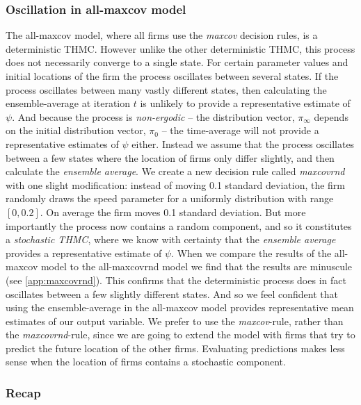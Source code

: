 \documentclass[preprint, 12pt]{elsarticle}
\begin{document}
\subsubsection{Oscillation in all-maxcov model}
\label{sec:oscmaxcov}

The all-maxcov model, where all firms use the \emph{maxcov} decision rules, is a deterministic THMC. However unlike the other deterministic THMC, this process does not necessarily converge to a single state. For certain parameter values and initial locations of the firm the process oscillates between several states. If the process oscillates between many vastly different states, then calculating the ensemble-average at iteration $t$ is unlikely to provide a representative estimate of $\psi$. And because the process is \emph{non-ergodic} -- the distribution vector, $\pi_\infty$ depends on the initial distribution vector, $\pi_0$ -- the time-average will not provide a representative estimates of $\psi$ either. Instead we assume that the process oscillates between a few states where the location of firms only differ slightly, and then calculate the \emph{ensemble average}. We create a new decision rule called \emph{maxcovrnd} with one slight modification: instead of moving 0.1 standard deviation, the firm randomly draws the speed parameter for a uniformly distribution with range $[0,0.2]$. On average the firm moves 0.1 standard deviation. But more importantly the process now contains a random component, and so it constitutes a \emph{stochastic THMC}, where we know with certainty that the \emph{ensemble average} provides a representative estimate of $\psi$. When we compare the results of the all-maxcov model to the all-maxcovrnd model we find that the results are minuscule (see \ref{app:maxcovrnd}). This confirms that the deterministic process does in fact oscillates between a few slightly different states. And so we feel confident that using the ensemble-average in the all-maxcov model provides representative mean estimates of our output variable. We prefer to use the \emph{maxcov}-rule, rather than the \emph{maxcovrnd}-rule, since we are going to extend the model with firms that try to predict the future location of the other firms. Evaluating predictions makes less sense when the location of firms contains a stochastic component.

\subsubsection*{Recap}
\end{document}
